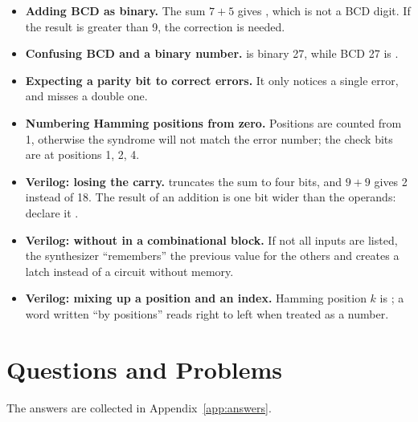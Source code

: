 \begin{warnbox}
\begin{itemize}
  \item \textbf{Adding BCD as binary.} The sum $7+5$ gives , which is not a
    BCD digit. If the result is greater than 9, the correction  is needed.
  \item \textbf{Confusing BCD and a binary number.}  is binary 27,
    while BCD 27 is .
  \item \textbf{Expecting a parity bit to correct errors.} It only notices a
    single error, and misses a double one.
  \item \textbf{Numbering Hamming positions from zero.} Positions are counted from 1,
    otherwise the syndrome will not match the error number; the check bits are at
    positions 1, 2, 4.
  \item \textbf{Verilog: losing the carry.} 
    truncates the sum to four bits, and $9+9$ gives 2 instead of 18. The result of
    an addition is one bit wider than the operands: declare it \code{[4:0]}.
  \item \textbf{Verilog:  without  in a combinational
    block.} If not all inputs are listed, the synthesizer ``remembers'' the
    previous value for the others and creates a latch instead of a circuit
    without memory.
  \item \textbf{Verilog: mixing up a position and an index.} Hamming position
    $k$ is ; a word written ``by positions'' reads right to left
    when treated as a number.
\end{itemize}
\end{warnbox}

\section{Questions and Problems}
\label{sec:tasks-codes}

The answers are collected in Appendix~\ref{app:answers}.

